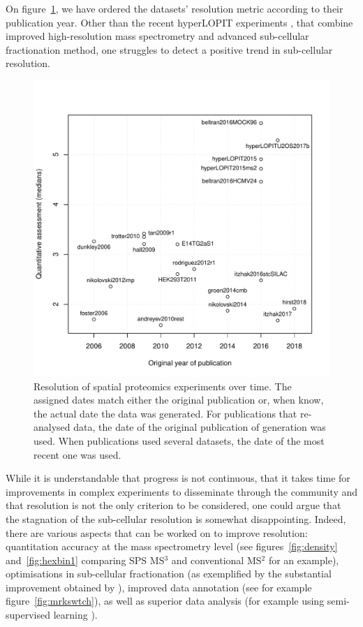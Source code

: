 \documentclass[12pt]{article}\usepackage[]{graphicx}\usepackage[]{color}
\newenvironment{knitrout}{}{} %
\begin{document}
On figure~\ref{fig:restime}, we have ordered the datasets' resolution
metric according to their publication year. Other than the recent
hyperLOPIT experiments \citet{Christoforou:2016}, that combine
improved high-resolution mass spectrometry and advanced sub-cellular
fractionation method, one struggles to detect a positive trend in
sub-cellular resolution.

\begin{figure}[h]
  \centering
\begin{knitrout}
\color{fgcolor}
\includegraphics[width=0.65\linewidth]{figure/restime-1} 

\end{knitrout}
\caption{Resolution of spatial proteomics experiments over time. The
  assigned dates match either the original publication or, when know,
  the actual date the data was generated. For publications that
  re-analysed data, the date of the original publication of generation
  was used. When publications used several datasets, the date of the
  most recent one was used.}
  \label{fig:restime}
\end{figure}


While it is understandable that progress is not continuous, that it
takes time for improvements in complex experiments to disseminate
through the community and that resolution is not the only criterion to
be considered, one could argue that the stagnation of the sub-cellular
resolution is somewhat disappointing. Indeed, there are various
aspects that can be worked on to improve resolution: quantitation
accuracy at the mass spectrometry level (see
figures~\ref{fig:density} and~\ref{fig:hexbin1} comparing SPS MS$^3$
and conventional MS$^2$ for an example), optimisations in sub-cellular
fractionation (as exemplified by the substantial improvement obtained
by \citep{Christoforou:2016}), improved data annotation (see for
example figure~\ref{fig:mrkswtch}), as well as superior data analysis
(for example using semi-supervised learning \citet{Breckels:2013}).
\end{document}

